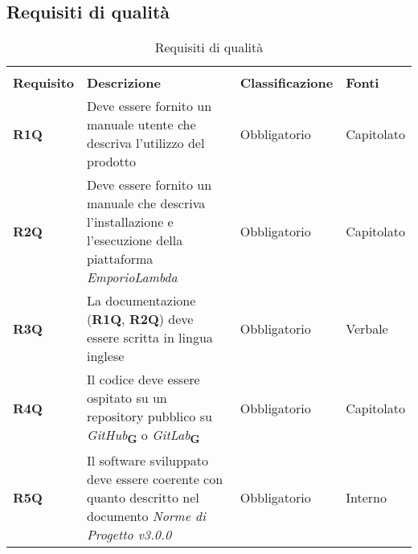 \subsection{Requisiti di qualità}
\begin{center}
    \centering
    \renewcommand{\arraystretch}{1.8}
    \label{tab:RequisitiQualita}
    \begin{longtable}[!h]{p{50px} p{200px} p{100px} p{50px}}
        \rowcolor{white}\caption{Requisiti di qualità}                                                                                                                                                                                                                                    \\
        \rowcolor{logo!70} \textbf{Requisito} & \textbf{Descrizione}                                                                                                                                                            & \textbf{Classificazione} & \textbf{Fonti}               \\
        \textbf{R1Q}                          & Deve essere fornito un manuale utente che descriva l'utilizzo del prodotto                                                                                                      & Obbligatorio             & Capitolato                   \\
        \textbf{R2Q}                          & Deve essere fornito un manuale che descriva l'installazione e l'esecuzione della piattaforma \textit{EmporioLambda}                                                             & Obbligatorio             & Capitolato                   \\
        \textbf{R3Q}                          & La documentazione (\textbf{R1Q}, \textbf{R2Q}) deve essere scritta in lingua inglese                                                                                            & Obbligatorio             & Verbale                      \\
        \textbf{R4Q}                          & Il codice deve essere ospitato su un repository pubblico su \textit{GitHub}\textsubscript{\textbf{G}} o \textit{GitLab}\textsubscript{\textbf{G}}                               & Obbligatorio             & Capitolato                   \\
        \textbf{R5Q}                          & Il software sviluppato deve essere coerente con quanto descritto nel documento \textit{Norme di Progetto v3.0.0}                                                                & Obbligatorio             & Interno                      \\

\end{longtable}
\end{center}
